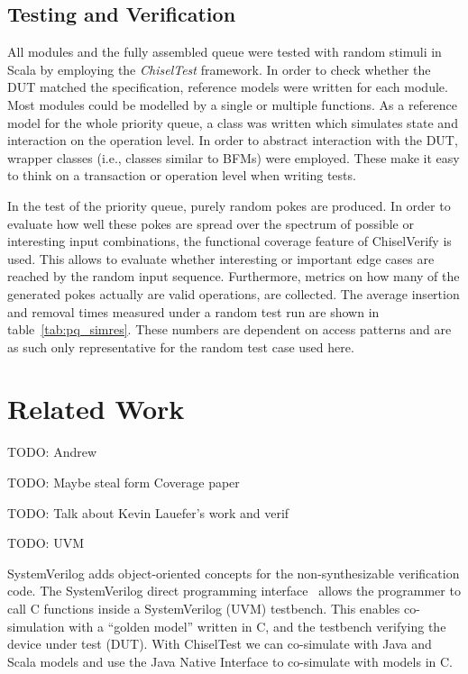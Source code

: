 \documentclass[runningheads]{llncs}
\newcommand{\todo}[1]{{\color{olive} TODO: #1}}
\begin{document}
\subsection{Testing and Verification}

All modules and the fully assembled queue were tested with random stimuli in Scala by employing the \textit{ChiselTest} framework.
In order to check whether the DUT matched the specification, reference models were written for each module. Most modules 
could be modelled by a single or multiple functions. As a reference model for the whole priority queue, a class 
was written which simulates state and interaction on the operation level. In order to abstract interaction with the DUT,
wrapper classes (i.e., classes similar to BFMs) were employed. These make it easy to think on a transaction or 
operation level when writing tests.

In the test of the priority queue, purely random pokes are produced. In order to evaluate how well these pokes are spread over the spectrum 
of possible or interesting input combinations, the functional coverage feature of ChiselVerify is used. This allows to evaluate whether interesting 
or important edge cases are reached by the random input sequence. Furthermore, metrics on how many of the generated pokes actually are valid 
operations, are collected. The average insertion and removal times measured under a random test run are shown in table~\ref{tab:pq_simres}.
These numbers are dependent on access patterns and are as such only representative for the random test case used here.

\section{Related Work}

\todo{Andrew}

\todo{Maybe steal form Coverage paper}

\todo{Talk about Kevin Lauefer's work and verif}

\todo{UVM}

SystemVerilog adds object-oriented concepts for the non-synthesizable verification code.
The SystemVerilog direct programming interface~\cite{Doulos:SV:dpi} allows the programmer to call
C functions inside a SystemVerilog (UVM) testbench.
This enables co-simulation with a ``golden model'' written in C, and the
testbench verifying the device under test (DUT).
With ChiselTest we can co-simulate with Java and Scala models and use the Java Native Interface
to co-simulate with models in C.
\end{document}
